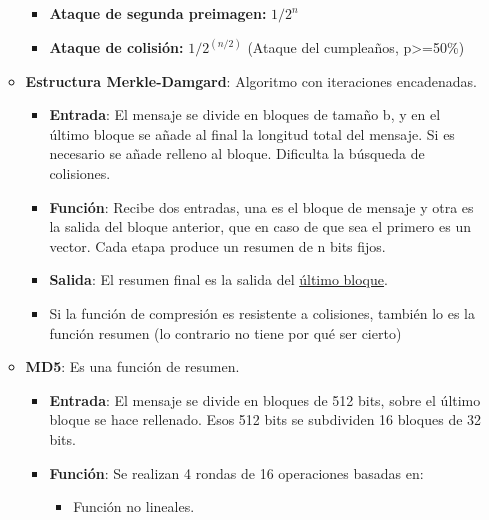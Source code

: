 \documentclass[12pt, twoside, openright]{report} %
\begin{document}
\begin{itemize}
\begin{itemize}
\begin{itemize}
      \item \textbf{Ataque de segunda preimagen:} $1/2^n$
        
      \item \textbf{Ataque de colisión:} $1/2^{(n/2)}$ (Ataque del
        cumpleaños, p\textgreater=50\%)
        
      \end{itemize}
    \item \textbf{Estructura Merkle-Damgard}: Algoritmo con iteraciones
      encadenadas.
      

      \begin{itemize}
      \item \textbf{Entrada}: El mensaje se divide en bloques de tamaño b, y
        en el último bloque se añade al final la longitud total del
        mensaje. Si es necesario se añade relleno al bloque. Dificulta
        la búsqueda de colisiones.
        
      \item \textbf{Función}: Recibe dos entradas, una es el bloque de
        mensaje y otra es la salida del bloque anterior, que en caso de
        que sea el primero es un vector. Cada etapa produce un resumen
        de n bits fijos.
        
      \item \textbf{Salida}: El resumen final es la salida del
        \underline{último bloque}.
        
      \item Si la función de compresión es resistente a colisiones, también
        lo es la función resumen (lo contrario no tiene por qué ser
        cierto)
        
      \end{itemize}
    \item \textbf{MD5}: Es una función de resumen.
      

      \begin{itemize}
      \item \textbf{Entrada}: El mensaje se divide en bloques de 512 bits,
        sobre el último bloque se hace rellenado. Esos 512 bits se
        subdividen 16 bloques de 32 bits.
        
      \item \textbf{Función}: Se realizan 4 rondas de 16 operaciones basadas
        en:
        

        \begin{itemize}
        \item Función no lineales.
          

\end{itemize}
\end{itemize}
\end{itemize}
\end{itemize}
\end{document}
